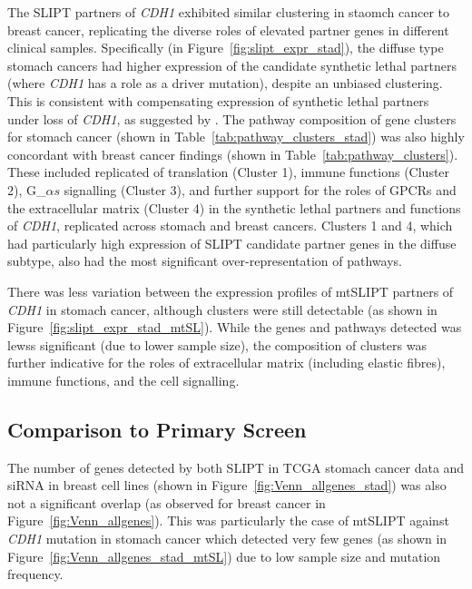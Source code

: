 The SLIPT partners of \textit{CDH1} exhibited similar clustering in staomch cancer to breast cancer, replicating the diverse roles of elevated partner genes in different clinical samples. Specifically (in Figure~\ref{fig:slipt_expr_stad}), the diffuse type stomach cancers had higher expression of the candidate synthetic lethal partners (where \textit{CDH1} has a role as a driver mutation), despite an unbiased clustering. This is consistent with compensating expression of synthetic lethal partners under loss of \textit{CDH1}, as suggested by \citet{Lu2015}. The pathway composition of gene clusters for stomach cancer (shown in Table~\ref{tab:pathway_clusters_stad}) was also highly concordant with breast cancer findings (shown in Table~\ref{tab:pathway_clusters}). These included replicated of translation (Cluster 1), immune functions (Cluster 2), G_${\alpha s}$ signalling (Cluster 3), and further support for the roles of GPCRs and the extracellular matrix (Cluster 4) in the synthetic lethal partners and functions of \textit{CDH1}, replicated across stomach and breast cancers. Clusters 1 and 4, which had particularly high expression of SLIPT candidate partner genes in the diffuse subtype, also had the most significant over-representation of pathways.

There was less variation between the expression profiles of mtSLIPT partners of \textit{CDH1} in stomach cancer, although clusters were still detectable (as shown in Figure~\ref{fig:slipt_expr_stad_mtSL}). While the genes and pathways detected was lewss significant (due to lower sample size), the composition of clusters was further indicative for the roles of extracellular matrix (including elastic fibres), immune functions, and the cell signalling.

\FloatBarrier

\subsection{Comparison to Primary Screen} \label{chapt3:compare_SL_genes_stad}

The number of genes detected by both SLIPT in TCGA stomach cancer data and siRNA in breast cell lines (shown in Figure~\ref{fig:Venn_allgenes_stad}) was also not a significant overlap (as observed for breast cancer in Figure~\ref{fig:Venn_allgenes}). This was particularly the case of mtSLIPT against \textit{CDH1} mutation in stomach cancer which detected very few genes (as shown in Figure~\ref{fig:Venn_allgenes_stad_mtSL}) due to low sample size and mutation frequency.

